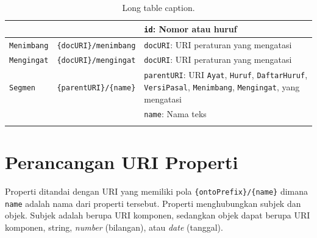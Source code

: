 \begin{longtable}{|p{}|p{}|p{}|}
                          &                                       & \texttt{id}: Nomor atau huruf                                                                                                                            \\ \hline
  \texttt{Menimbang}      & \texttt{\{docURI\}/menimbang}         & \texttt{docURI}: URI peraturan yang mengatasi                                                                                                            \\ \hline
  \texttt{Mengingat}      & \texttt{\{docURI\}/mengingat}         & \texttt{docURI}: URI peraturan yang mengatasi                                                                                                            \\ \hline
  \texttt{Segmen}         & \texttt{\{parentURI\}/\{name\}}       & \texttt{parentURI}: URI \texttt{Ayat}, \texttt{Huruf}, \texttt{DaftarHuruf}, \texttt{VersiPasal}, \texttt{Menimbang}, \texttt{Mengingat}, yang mengatasi \\
                          &                                       & \texttt{name}: Nama teks                                                                                                                                 \\ \hline
  \caption{Long table caption.\label{longs}}                                                                                                                                                                                 \\
\end{longtable}

\section{Perancangan URI Properti}\label{perancangan-uri-properti}

Properti ditandai dengan URI yang memiliki pola \texttt{\{ontoPrefix\}/\{name\}} dimana
\texttt{name} adalah nama dari properti tersebut. Properti menghubungkan subjek dan objek. Subjek
adalah berupa URI komponen, sedangkan objek dapat berupa URI komponen, string, \emph{number}
(bilangan), atau \emph{date} (tanggal).


